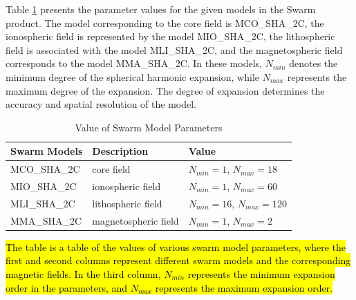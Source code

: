 \documentclass[3p,authoryear,preprint,12pt]{elsarticle}
\begin{document}
Table \ref{tab:SHparam} presents the parameter values for the given models in the Swarm product. The model corresponding to the core field is MCO\_SHA\_2C, the ionospheric field is represented by the model MIO\_SHA\_2C, the lithospheric field is associated with the model MLI\_SHA\_2C, and the magnetospheric field corresponds to the model MMA\_SHA\_2C. In these models, $N_{min}$ denotes the minimum degree of the spherical harmonic expansion, while $N_{max}$ represents the maximum degree of the expansion. The degree of expansion determines the accuracy and spatial resolution of the model.
\begin{table}[htbp]
	\caption{Value of Swarm Model Parameters}
	\label{tab:SHparam}
	\centering
	\begin{threeparttable}
	\begin{tabular}{lll}
		\toprule
		\textbf{Swarm Models}&\textbf{ Description} & \textbf{Value} \\
		\midrule
		MCO\_SHA\_2C & core field&  $N_{min}=1$, $N_{max}=18$ \\ 
		MIO\_SHA\_2C&  ionospheric field&  $N_{min}=1$, $N_{max}=60$ \\
		MLI\_SHA\_2C&   lithospheric field&  $N_{min}=16$, $N_{max}=120$ \\
		MMA\_SHA\_2C &  magnetospheric field&  $N_{min}=1$, $N_{max}=2$ \\
		\bottomrule
	\end{tabular}
	\begin{tablenotes}
		\item \hl{The table is a table of the values ​​of various swarm model parameters, where the first and second columns represent different swarm models and the corresponding magnetic fields. In the third column, $N_{min}$ represents the minimum expansion order in the parameters, and $N_{max}$ represents the maximum expansion order.}
	\end{tablenotes}
	\end{threeparttable}
\end{table}
\end{document}
